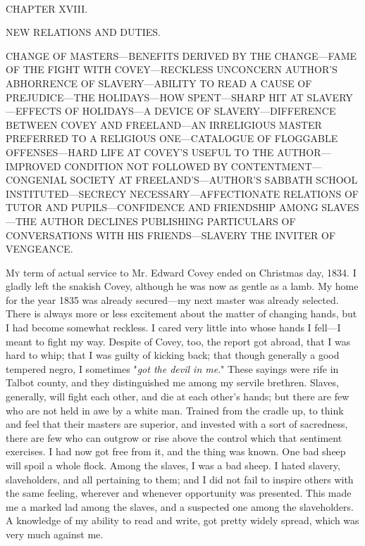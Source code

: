 {\protect\hypertarget{250}{}{}}

~

{CHAPTER XVIII.}

NEW RELATIONS AND DUTIES.

{CHANGE OF MASTERS---BENEFITS DERIVED BY THE CHANGE---FAME OF THE FIGHT
WITH COVEY---RECKLESS UNCONCERN AUTHOR'S ABHORRENCE OF SLAVERY---ABILITY
TO READ A CAUSE OF PREJUDICE---THE HOLIDAYS---HOW SPENT---SHARP HIT AT
SLAVERY---EFFECTS OF HOLIDAYS---A DEVICE OF SLAVERY---DIFFERENCE BETWEEN
COVEY AND FREELAND---AN IRRELIGIOUS MASTER PREFERRED TO A RELIGIOUS
ONE---CATALOGUE OF FLOGGABLE OFFENSES---HARD LIFE AT COVEY'S USEFUL TO
THE AUTHOR---IMPROVED CONDITION NOT FOLLOWED BY CONTENTMENT---CONGENIAL
SOCIETY AT FREELAND'S---AUTHOR'S SABBATH SCHOOL INSTITUTED---SECRECY
NECESSARY---AFFECTIONATE RELATIONS OF TUTOR AND PUPILS---CONFIDENCE AND
FRIENDSHIP AMONG SLAVES---THE AUTHOR DECLINES PUBLISHING PARTICULARS OF
CONVERSATIONS WITH HIS FRIENDS---SLAVERY THE INVITER OF VENGEANCE.}

\textsc{My} term of actual service to Mr. Edward Covey ended on
Christmas day, 1834. I gladly left the snakish Covey, although he was
now as gentle as a lamb. My home for the year 1835 was already
secured---my next master was already selected. There is always more or
less excitement about the matter of changing hands, but I had become
somewhat reckless. I cared very little into whose hands I fell---I meant
to fight my way. Despite of Covey, too, the report got abroad, that I
was hard to whip; that I was guilty of kicking back; that though
generally a good tempered negro, I sometimes "\emph{got the devil in
me}." These sayings were rife in Talbot county, and they distinguished
me among my servile brethren. Slaves,
{\protect\hypertarget{251}{}{}}generally, will fight each other, and die
at each other's hands; but there are few who are not held in awe by a
white man. Trained from the cradle up, to think and feel that their
masters are superior, and invested with a sort of sacredness, there are
few who can outgrow or rise above the control which that sentiment
exercises. I had now got free from it, and the thing was known. One bad
sheep will spoil a whole flock. Among the slaves, I was a bad sheep. I
hated slavery, slaveholders, and all pertaining to them; and I did not
fail to inspire others with the same feeling, wherever and whenever
opportunity was presented. This made me a marked lad among the slaves,
and a suspected one among the slaveholders. A knowledge of my ability to
read and write, got pretty widely spread, which was very much against
me.

